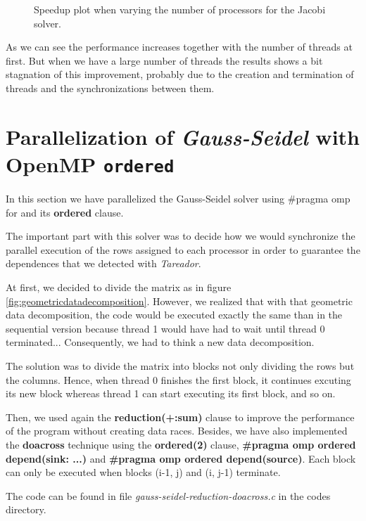 \documentclass[12pt, a4paper]{article}
\begin{document}
\begin{figure}[H]
\begin{minipage}{0.4\linewidth}
  \caption{Speedup plot when varying the number of processors for the Jacobi solver.}
    \label{plot:speed-gauss}
\end{minipage}
\end{figure}

As we can see the performance increases together with the number of threads at first. But when we have a large number of threads the results shows a bit stagnation of this improvement, probably due to the creation and termination of threads and the synchronizations between them.

\section{Parallelization of \textit{Gauss-Seidel} with OpenMP \texttt{ordered}}

In this section we have parallelized the Gauss-Seidel solver using \#pragma omp for and its \textbf{ordered} clause.

The important part with this solver was to decide how we would synchronize the parallel execution of the rows assigned to each processor in order to guarantee the dependences that we detected with \textit{Tareador}.

At first, we decided to divide the matrix as in figure \ref{fig:geometricdatadecomposition}. However, we realized that with that geometric data decomposition, the code would be executed exactly the same than in the sequential version because thread 1 would have had to wait until thread 0 terminated... Consequently, we had to think a new data decomposition.

The solution was to divide the matrix into blocks not only dividing the rows but the columns. Hence, when thread 0 finishes the first block, it continues excuting its new block whereas thread 1 can start executing its first block, and so on.

Then, we used again the \textbf{reduction(+:sum)} clause to improve the performance of the program without creating data races. Besides, we have also implemented the \textbf{doacross} technique using the \textbf{ordered(2)} clause, \textbf{\#pragma omp ordered depend(sink: ...)} and \textbf{\#pragma omp ordered depend(source)}. Each block can only be executed when blocks (i-1, j) and (i, j-1) terminate.

The code can be found in file \textit{gauss-seidel-reduction-doacross.c} in the codes directory.
\end{document}

